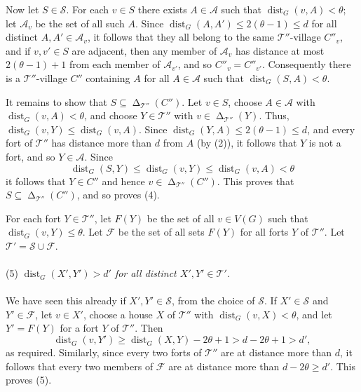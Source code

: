 \documentclass[titlepage,11pt]{article}
\newcommand{\dist}{\operatorname{dist}}
\newcommand{\voro}{\operatorname{\Delta}}
\newcommand{\mac}{\mathcal}
\begin{document}
	Now let $S\in \mac S$. 
	For each $v\in S$ there exists $A\in \mac A$ such that $\dist_{G}(v, A)<\theta$; let $\mac A_v$ be the set of all such $A$. Since
	$\dist_G(A,A')\le 2(\theta-1)\le d$ for all distinct $A,A'\in \mac A_v$, it follows that they all belong to the same 
	$\mac T''$-village $C''_v$, and if $v,v'\in S$ are adjacent, then any member of $\mac A_v$ has distance at most $2(\theta-1)+1$ from each member of $\mac A_{v'}$,
	and so $C''_v=C''_{v'}$. Consequently there is a $\mac T''$-village $C''$ containing $A$ for all $A\in \mac A$ such that 
	$\dist_{G}(S, A)<\theta$.  
	
	It remains to show that $S\subseteq \voro_{\mac T''}(C'')$. Let $v\in S$, choose $A\in \mac A$ with $\dist_G(v,A)<\theta$, and choose $Y\in \mac T''$ with $v\in \voro_{\mac T''}(Y)$. Thus, $\dist_G(v,Y)\le \dist_G(v,A)$. Since $\dist_G(Y,A)\le 2(\theta-1)\le d$,
	and every
	fort of $\mac T''$ has distance more than $d$ from $A$ (by (2)), it follows that $Y$ is not a fort, and so $Y\in \mac A$. Since
	$$\dist_G(S,Y)\le \dist_G(v,Y)\le \dist_G(v,A)<\theta$$ 
	it follows that $Y\in C''$ and hence $v\in  \voro_{\mac T''}(C'')$. This proves that $S\subseteq \voro_{\mac T''}(C'')$, and so proves (4).
	
	
	\bigskip
	
	For each fort $Y\in \mac T''$, let $F(Y)$ be the set of all 
	$v\in V(G)$ such that $\dist_G(v, Y)\le \theta$. Let $\mac F$ be the set of all sets $F(Y)$ for all forts $Y$ of $\mac T''$.
	Let $\mac T'= \mac S\cup \mac F$.
	\\
	\\
	(5) {\em $\dist_G(X',Y')> d'$ for all distinct $X',Y'\in \mac T'$.}
	\\
	\\
	We have seen this already if $X',Y'\in \mac S$, from the choice of $\mac S$.
	If $X'\in \mac S$ and $Y'\in \mac F$, let $v\in X'$, choose a house $X$ of $\mac T''$ with $\dist_G(v,X)<\theta$, and let $Y'=F(Y)$
	for a fort $Y$ of $\mac T''$. Then 
	$$\dist_G(v,Y')\ge \dist_G(X,Y)-2\theta+1> d-2\theta+1>d',$$ as required. 
	Similarly, 
	since every two 
	forts of $\mac T''$ are at distance more than $d$, it follows that every two members of $\mac F$ are 
	at distance more than $d-2\theta\ge d'$. This proves (5).
	
	\bigskip
	
\end{document}
